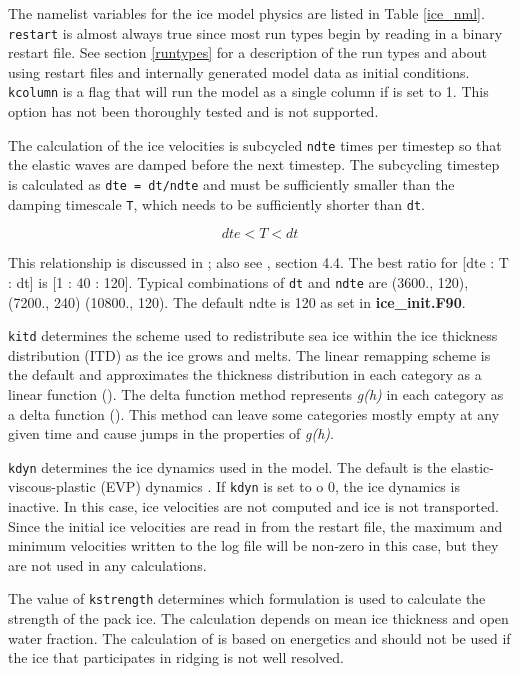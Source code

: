 The namelist variables for the ice model physics are listed in Table 
\ref{ice_nml}.  {\tt restart} is almost always true since most
run types begin by reading in a binary restart file.  See section 
\ref{runtypes} for a description of the run types and about using
restart files and internally generated model data as initial conditions.
{\tt kcolumn} is a flag that will run the model as a single column if is
set to 1.  This option has not been thoroughly tested and is not supported. 

The calculation of the ice velocities is subcycled {\tt ndte} times per
timestep so that the elastic waves are damped before the next timestep. The
subcycling timestep is calculated as {\tt dte = dt/ndte}
and must be sufficiently smaller than the damping timescale {\tt T},
which needs to be sufficiently shorter than {\tt dt}.

\begin{equation}
 dte < T < dt
\end{equation}

This relationship is discussed in \cite{hunk01}; also see \cite{cice08}, 
section 4.4.  The best ratio for [dte : T : dt] is [1 : 40 : 120]. Typical 
combinations of {\tt dt} and {\tt ndte} are (3600., 120), (7200., 240) 
(10800., 120). The default ndte is 120 as set in {\bf ice\_init.F90}.

{\tt kitd} determines the scheme used to redistribute sea ice within the ice 
thickness distribution (ITD) as the ice grows and melts.  The linear remapping 
scheme is the default and approximates the thickness distribution in each 
category as a linear function (\cite{lips01}).  The delta function method 
represents {\it g(h)} in each category as a delta function (\cite{bitz01}).  
This method can leave some categories mostly empty at any given time and cause 
jumps in the properties of {\it g(h)}.

{\tt kdyn} determines the ice dynamics used in the model.  The default is the
elastic-viscous-plastic (EVP) dynamics \cite{hunk97}.  If {\tt kdyn} is set to o
0, the ice dynamics is inactive. In this case, ice velocities are not computed
and ice is not transported.  Since the initial ice velocities are read in
from the restart file, the maximum and minimum velocities written to the 
log file will be non-zero in this case, but they are not used in any calculations.

The value of {\tt kstrength} determines which formulation is used to
calculate the strength of the pack ice.  The \cite{hibl79} calculation
depends on mean ice thickness and open water fraction.  The calculation
of \cite{roth75b} is based on energetics and should not be used if the
ice that participates in ridging is not well resolved.  

